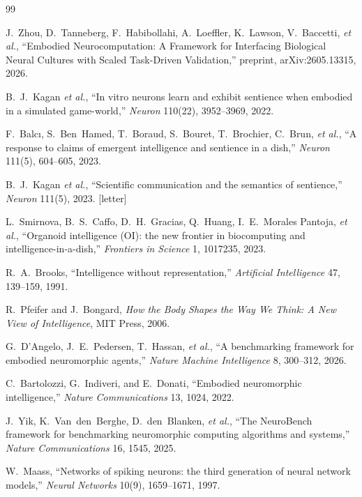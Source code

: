 \documentclass[10pt,a4paper]{article}
\begin{document}

\begin{thebibliography}{99}

J.~Zhou, D.~Tanneberg, F.~Habibollahi, A.~Loeffler, K.~Lawson,
V.~Baccetti, \emph{et al.}, ``Embodied Neurocomputation: A Framework for
Interfacing Biological Neural Cultures with Scaled Task-Driven
Validation,'' preprint, arXiv:2605.13315, 2026.

B.~J.~Kagan \emph{et al.}, ``In vitro neurons learn and exhibit
sentience when embodied in a simulated game-world,'' \emph{Neuron}
110(22), 3952--3969, 2022.

F.~Balc{\i}, S.~Ben~Hamed, T.~Boraud, S.~Bouret, T.~Brochier,
C.~Brun, \emph{et al.}, ``A response to claims of emergent
intelligence and sentience in a dish,'' \emph{Neuron} 111(5),
604--605, 2023.

B.~J.~Kagan \emph{et al.}, ``Scientific communication and the
semantics of sentience,'' \emph{Neuron} 111(5), 2023. [letter]

L.~Smirnova, B.~S.~Caffo, D.~H.~Gracias, Q.~Huang, I.~E.~Morales
Pantoja, \emph{et al.}, ``Organoid intelligence (OI): the new frontier
in biocomputing and intelligence-in-a-dish,'' \emph{Frontiers in
Science} 1, 1017235, 2023.

R.~A.~Brooks, ``Intelligence without representation,''
\emph{Artificial Intelligence} 47, 139--159, 1991.

R.~Pfeifer and J.~Bongard, \emph{How the Body Shapes the Way We
Think: A New View of Intelligence}, MIT Press, 2006.

G.~D'Angelo, J.~E.~Pedersen, T.~Hassan, \emph{et al.}, ``A benchmarking
framework for embodied neuromorphic agents,'' \emph{Nature Machine
Intelligence} 8, 300--312, 2026.

C.~Bartolozzi, G.~Indiveri, and E.~Donati, ``Embodied neuromorphic
intelligence,'' \emph{Nature Communications} 13, 1024, 2022.

J.~Yik, K.~Van~den~Berghe, D.~den~Blanken, \emph{et al.}, ``The
NeuroBench framework for benchmarking neuromorphic computing algorithms
and systems,'' \emph{Nature Communications} 16, 1545, 2025.

W.~Maass, ``Networks of spiking neurons: the third generation of
neural network models,'' \emph{Neural Networks} 10(9), 1659--1671,
1997.


\end{thebibliography}
\end{document}
